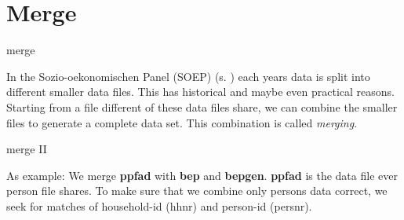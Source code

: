 \section{Merge}
\begin{frame}{merge} 
\begin{minipage}{11cm}
In the Sozio-oekonomischen Panel (SOEP) (s. \cite{Wagner07}) each years data is split into different smaller data files. This has historical and maybe even practical reasons.\\
Starting from a file different of these data files share, we can combine the smaller files to generate a complete data set. This combination is called \textit{merging}.
\end{minipage}
\end{frame}

\begin{frame}[fragile]{merge II} 
\begin{minipage}{11cm}
As example: We merge \textbf{ppfad} with \textbf{bep} and \textbf{bepgen}. \textbf{ppfad} is the data file ever person file shares. To make sure that we combine only persons data correct, we seek for matches of household-id (hhnr) and person-id (persnr).\\

\end{minipage}
\end{frame}


